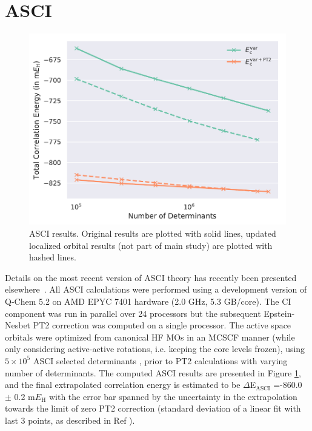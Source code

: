 \documentclass[journal=jcp,manuscript=suppinfo]{achemso}
\begin{document}
\section{ASCI}
\label{sec:asci}
%
\begin{figure}[ht!]
\begin{center}
\includegraphics[scale=0.75]{figures/asci/asci.pdf}
\caption{ASCI results. Original results are plotted with solid lines, updated localized orbital results (not part of main study) are plotted with hashed lines.}
\label{asci_SI_fig}
\end{center}
\vspace{-0.6cm}
\end{figure}
%
Details on the most recent version of ASCI theory has recently been presented elsewhere~\cite{tubman_whaley_selected_ci_jctc_2020,tubman_whaley_selected_ci_pt_arxiv_2018}. 
All ASCI calculations were performed using a development version of Q-Chem 5.2\cite{shao2015advances}  on AMD EPYC 7401 hardware (2.0 GHz, 5.3 GB/core). The CI component was run in parallel over 24 processors but the subsequent Epstein-Nesbet PT2 correction was computed on a single processor. The active space orbitals were optimized from canonical HF MOs in an MCSCF manner (while only considering active-active rotations, i.e. keeping the core levels frozen), using $5\times 10^5$ ASCI selected determinants  \cite{levine2020casscf}, prior to PT2 calculations with varying number of determinants.
The computed ASCI results are presented in  Figure \ref{asci_SI_fig}, and the final extrapolated correlation energy is estimated to be $\Delta$E$_\textrm{ASCI}$ =-860.0 $\pm$ 0.2 m$E_{\text{H}}$ with the error bar spanned by the uncertainty in the extrapolation towards the limit of zero PT2 correction (standard deviation of a linear fit with last 3 points, as described in Ref ).
\end{document}
